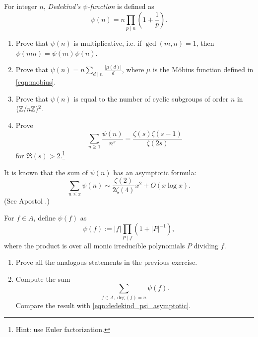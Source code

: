 \begin{exercise}
    For integer $n$, \emph{Dedekind's $\psi$-function} is defined as
    \begin{equation}
        \psi(n) = n \prod_{p \mid n} \left(1 + \frac{1}{p}\right).
        \label{eqn:dedekind_psi}
    \end{equation}
    \begin{enumerate}
        \item Prove that $\psi(n)$ is multiplicative, i.e. if $\gcd(m, n) = 1$, then $\psi(mn) = \psi(m) \psi(n)$.
        \item Prove that $\psi(n) = n \sum_{d \mid n} \frac{|\mu(d)|}{d}$, where $\mu$ is the M\"obius function defined in \eqref{eqn:mobius}.
        \item Prove that $\psi(n)$ is equal to the number of cyclic subgroups of order $n$ in $(\mathbb{Z} / n \mathbb{Z})^2$.
        \item Prove
        \[
        \sum_{n \ge 1} \frac{\psi(n)}{n^s} = \frac{\zeta(s) \zeta(s - 1)}{\zeta(2s)}
        \]
        for $\Re(s) > 2$.\footnote{Hint: use Euler factorization.}
    \end{enumerate}
    It is known that the sum of $\psi(n)$ has an asymptotic formula:
    \begin{equation}
        \sum_{n \le x} \psi(n) \sim \frac{\zeta(2)}{2\zeta(4)} x^2 + O(x \log x).
        \label{eqn:dedekind_psi_asymptotic}
    \end{equation}
    (See Apostol \cite[p. 71, Exercise 11]{apostol2013introduction}.)
\end{exercise}

\begin{exercise}
    For $f \in A$, define $\psi(f)$ as
    \begin{equation}
        \psi(f) := |f| \prod_{P \mid f} (1 + |P|^{-1}),
        \label{eqn:dedekind_psi_poly}
    \end{equation}
    where the product is over all monic irreducible polynomials $P$ dividing $f$.
    \begin{enumerate}
        \item Prove all the analogous statements in the previous exercise.
        \item Compute the sum
        \[
        \sum_{f \in A, \deg(f) = n} \psi(f).
        \]
        Compare the result with \eqref{eqn:dedekind_psi_asymptotic}.
    \end{enumerate}
\end{exercise}


\newpage
